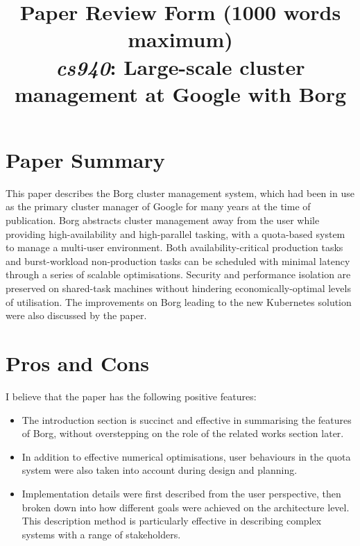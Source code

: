 \documentclass[11pt]{article}
\begin{document}
\title{Paper Review Form (1000 words maximum)\\
  \emph{cs940}: Large-scale cluster management at Google with Borg \cite{verma2015large}}
\maketitle

\section*{Paper Summary}

This paper describes the Borg cluster management system, which had been in use as the primary cluster manager of Google for many years at the time of publication. Borg abstracts cluster management away from the user while providing high-availability and high-parallel tasking, with a quota-based system to manage a multi-user environment. Both availability-critical production tasks and burst-workload non-production tasks can be scheduled with minimal latency through a series of scalable optimisations. Security and performance isolation are preserved on shared-task machines without hindering economically-optimal levels of utilisation. The improvements on Borg leading to the new Kubernetes solution were also discussed by the paper.
 
\section*{Pros and Cons}

I believe that the paper has the following positive features:
\begin{itemize}
	\item The introduction section is succinct and effective in summarising the features of Borg, without overstepping on the role of the related works section later.
	\item In addition to effective numerical optimisations, user behaviours in the quota system were also taken into account during design and planning.
	\item Implementation details were first described from the user perspective, then broken down into how different goals were achieved on the architecture level. This description method is particularly effective in describing complex systems with a range of stakeholders.
\end{itemize}
\end{document}
